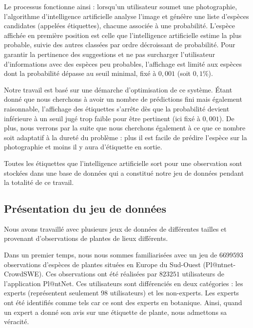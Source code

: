 \documentclass[a4paper,12pt]{article}
\begin{document}
Le processus fonctionne ainsi : lorsqu'un utilisateur soumet une photographie, l'algorithme d'intelligence artificielle analyse l'image et généère une liste d'espèces candidates (appelées étiquettes), chacune associée à une probabilité. L'espèce affichée en première position est celle que l'intelligence artificielle estime la plus probable, suivie des autres classées par ordre décroissant de probabilité. Pour garantir la pertinence des suggestions et ne pas surcharger l'utilisateur d'informations avec des espèces peu probables, l'affichage est limité aux espèces dont la probabilité dépasse au seuil minimal, fixé à $0,001$ (soit $0,1\%$).

\vspace{0.2cm}


Notre travail est basé sur une démarche d'optimisation de ce système.
Étant donné que nous cherchons à avoir un nombre de prédictions fini mais également raisonnable, l'affichage des étiquettes s'arrête dès que la probabilité devient inférieure à un seuil jugé trop faible pour être pertinent (ici fixé à $0,001$). De plus, nous verrons par la suite que nous cherchons également à ce que ce nombre soit adaptatif à la dureté du problème : plus il est facile de prédire l'espèce sur la photographie et moins il y aura d'étiquette en sortie.

\vspace{0.2cm}

Toutes les étiquettes que l'intelligence artificielle sort pour une observation sont stockées dans une base de données qui a constitué notre jeu de données pendant la totalité de ce travail.


\subsection{Présentation du jeu de données}

Nous avons travaillé avec plusieurs jeux de données de différentes tailles et provenant d'observations de plantes de lieux différents.

\vspace{0.2cm}

Dans un premier temps, nous nous sommes familiarisées avec un jeu de $6 699 593$ observations d'espèces de plantes situées en Europe du Sud-Ouest (Pl@ntnet-CrowdSWE). Ces observations ont été réalisées par $823 251$ utilisateurs de l'application Pl@ntNet. Ces utilisateurs sont différenciés en deux catégories : les experts (représentent seulement $98$ utilisateurs) et les non-experts. Les experts ont été identifiés comme tels car ce sont des experts en botanique. Ainsi, quand un expert a donné son avis sur une étiquette de plante, nous admettons sa véracité. 
\end{document}
